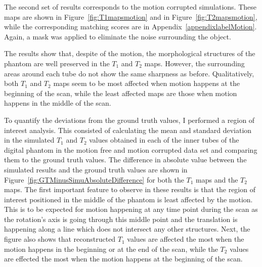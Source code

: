The second set of results corresponds to the motion corrupted simulations.
These maps are shown in Figure~\ref{fig:T1mapsmotion} and in Figure~\ref{fig:T2mapsmotion}, while the corresponding matching scores are in Appendix~\ref{appendixlabelMotion}.
Again, a mask was applied to eliminate the noise surrounding the object.

\hfill

The results show that, despite of the motion, the morphological structures of the phantom are well preserved in the $T_1$ and $T_2$ maps. 
However, the surrounding areas around each tube do not show the same sharpness as before.
Qualitatively, both $T_1$ and $T_2$ maps seem to be most affected when motion happens at the beginning of the scan, while the least affected maps are those when motion happens in the middle of the scan.

\hfill

To quantify the deviations from the ground truth values, I performed a region of interest analysis.
This consisted of calculating the mean and standard deviation in the simulated $T_1$ and $T_2$ values obtained in each of the inner tubes of the digital phantom in the motion free and motion corrupted data set and comparing them to the ground truth values.
The difference in absolute value between the simulated results and the ground truth values are shown in Figure~\ref{fig:GTMinusSimuAbsoluteDifference} for both the $T_1$ maps and the $T_2$ maps.
The first important feature to observe in these results is that the region of interest positioned in the middle of the phantom is least affected by the motion.
This is to be expected for motion happening at any time point during the scan as the rotation's axis is going through this middle point and the translation is happening along a line which does not intersect any other structures.
Next, the figure also shows that reconstructed $T_1$ values are affected the most when the motion happens in the beginning or at the end of the scan, while the $T_2$ values are effected the most when the motion happens at the beginning of the scan.

\hfill

